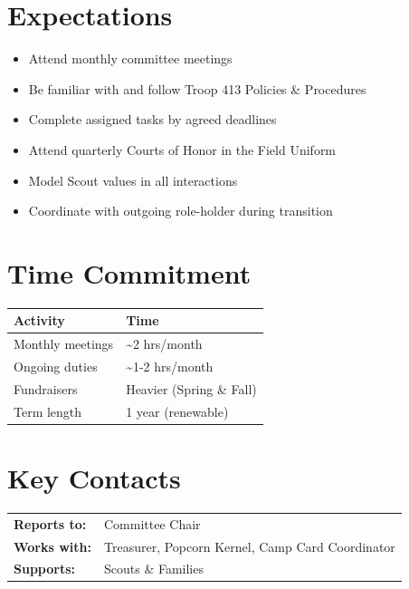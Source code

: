 \documentclass[11pt, letterpaper]{article}
\begin{document}
\hfill
\begin{minipage}[t]{0.48\linewidth}
\raggedright

\section{Expectations}
\begin{itemize}
  \item Attend monthly committee meetings
  \item Be familiar with and follow Troop 413 Policies \& Procedures
  \item Complete assigned tasks by agreed deadlines
  \item Attend quarterly Courts of Honor in the Field Uniform
  \item Model Scout values in all interactions
  \item Coordinate with outgoing role-holder during transition
\end{itemize}

\section{Time Commitment}
\begin{tabular}{@{}p{3.0cm} p{3.8cm}@{}}
  \toprule
  \textbf{Activity} & \textbf{Time} \\
  \midrule
  Monthly meetings  & \textasciitilde{}2 hrs/month \\
  Ongoing duties    & \textasciitilde{}1-2 hrs/month \\
  Fundraisers       & Heavier (Spring \& Fall) \\
  Term length       & 1 year (renewable) \\
  \bottomrule
\end{tabular}

\vspace{1em}

\section{Key Contacts}
\begin{tabular}{@{}p{2.6cm} >{\raggedright\arraybackslash}p{4.2cm}@{}}
  \textbf{Reports to:}  & Committee Chair \\
  \textbf{Works with:}  & Treasurer, Popcorn Kernel, Camp Card Coordinator \\
  \textbf{Supports:}    & Scouts \& Families \\
\end{tabular}

\end{minipage}
\end{document}
